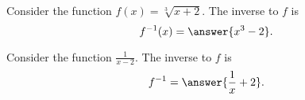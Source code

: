\documentclass{ximera}
\author{Nela Lakos \and Kyle Parsons}
\begin{document}
\begin{exercise}

Consider the function $\displaystyle{f(x) = \sqrt[3]{x+2}}$.  The inverse to $f$ is 
\[
f^{-1}(x) = \answer{x^3 - 2}.
\]

\begin{exercise}

Consider the function $\displaystyle{\frac{1}{x-2}}$. The inverse to $f$ is
\[
f^{-1} = \answer{\frac{1}{x} + 2}.
\]

\end{exercise}
\end{exercise}
\end{document}
